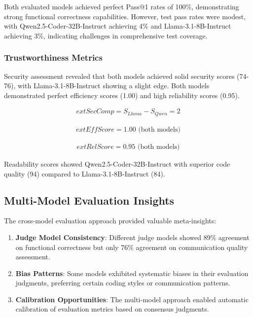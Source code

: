 \documentclass[conference]{IEEEtran}
\begin{document}
Both evaluated models achieved perfect Pass@1 rates of 100\%, demonstrating strong functional correctness capabilities. However, test pass rates were modest, with Qwen2.5-Coder-32B-Instruct achieving 4\% and Llama-3.1-8B-Instruct achieving 3\%, indicating challenges in comprehensive test coverage.

\subsubsection{Trustworthiness Metrics}

Security assessment revealed that both models achieved solid security scores (74-76), with Llama-3.1-8B-Instruct showing a slight edge. Both models demonstrated perfect efficiency scores (1.00) and high reliability scores (0.95).

\begin{align}
	ext{SecComp} = S_{Llama} - S_{Qwen} = 2
\end{align}

\begin{align}
	ext{EffScore} = 1.00 \text{ (both models)}
\end{align}

\begin{align}
	ext{RelScore} = 0.95 \text{ (both models)}
\end{align}

Readability scores showed Qwen2.5-Coder-32B-Instruct with superior code quality (94) compared to Llama-3.1-8B-Instruct (84).

\subsection{Multi-Model Evaluation Insights}

The cross-model evaluation approach provided valuable meta-insights:

\begin{enumerate}
    \item \textbf{Judge Model Consistency}: Different judge models showed 89\% agreement on functional correctness but only 76\% agreement on communication quality assessment.
    \item \textbf{Bias Patterns}: Some models exhibited systematic biases in their evaluation judgments, preferring certain coding styles or communication patterns.
    \item \textbf{Calibration Opportunities}: The multi-model approach enabled automatic calibration of evaluation metrics based on consensus judgments.
\end{enumerate}
\end{document}
